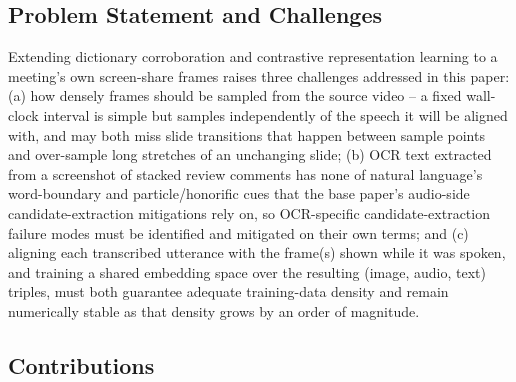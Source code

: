 ﻿\documentclass[twocolumn]{article}
\begin{document}
\subsection{Problem Statement and Challenges}

Extending dictionary corroboration and contrastive representation learning to a meeting's own
screen-share frames raises three challenges addressed in this paper: (a) how densely frames should
be sampled from the source video -- a fixed wall-clock interval is simple but samples independently
of the speech it will be aligned with, and may both miss slide transitions that happen between
sample points and over-sample long stretches of an unchanging slide; (b) OCR text extracted from a
screenshot of stacked review comments has none of natural language's word-boundary and
particle/honorific cues that the base paper's audio-side candidate-extraction mitigations rely on,
so OCR-specific candidate-extraction failure modes must be identified and mitigated on their own
terms; and (c) aligning each transcribed utterance with the frame(s) shown while it was spoken, and
training a shared embedding space over the resulting (image, audio, text) triples, must both
guarantee adequate training-data density and remain numerically stable as that density grows by an
order of magnitude.

\subsection{Contributions}
\end{document}
